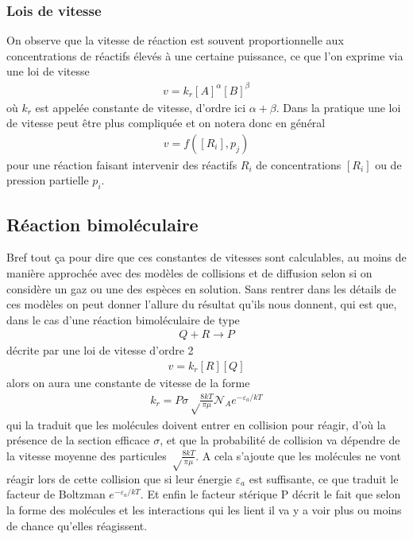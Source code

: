 \documentclass[12pt,prb,aps,epsf]{report}
\begin{document}
\subsubsection{Lois de vitesse}
On observe que la vitesse de réaction est souvent proportionnelle aux concentrations de réactifs élevés à une certaine puissance, ce que l'on exprime via une loi de vitesse
\begin{eqnarray}
v = k_r [A]^{\alpha}[B]^{\beta}
\end{eqnarray}
où $k_r$ est appelée constante de vitesse, d'ordre ici $\alpha+\beta$. Dans la pratique une loi de vitesse peut être plus compliquée et on notera donc en général 
\begin{eqnarray}
v = f([R_i],p_j)
\end{eqnarray}
pour une réaction faisant intervenir des réactifs $R_i$ de concentrations $[R_i]$ ou de pression partielle $p_i$.\\
\subsection{Réaction bimoléculaire}
Bref tout ça pour dire que ces constantes de vitesses sont calculables, au moins de manière approchée avec des modèles de collisions et de diffusion selon si on considère un gaz ou une des espèces en solution. Sans rentrer dans les détails de ces modèles on peut donner l'allure du résultat qu'ils nous donnent, qui est que, dans le cas d'une réaction bimoléculaire de type 
\begin{eqnarray}
Q + R \rightarrow P
\end{eqnarray}
décrite par une loi de vitesse d'ordre 2
\begin{eqnarray}
v = k_r[R][Q]
\end{eqnarray}
alors on aura une constante de vitesse de la forme
\begin{eqnarray}
k_r = P\sigma \sqrt\frac{8kT}{\pi \mu} \mathcal{N}_A e^{-\varepsilon_a/kT}
\end{eqnarray}
qui la traduit que les molécules doivent entrer en collision pour réagir, d'où la présence de la section efficace $\sigma$, et que la probabilité de collision va dépendre de la vitesse moyenne des particules $\sqrt\frac{8kT}{\pi \mu}$. A cela s'ajoute que les molécules ne vont réagir lors de cette collision que si leur énergie $\varepsilon_a$ est suffisante, ce que traduit le facteur de Boltzman $e^{-\varepsilon_a/kT}$. Et enfin le facteur stérique P décrit le fait que selon la forme des molécules et les interactions qui les lient il va y a voir plus ou moins de chance qu'elles réagissent.\\
\end{document}
